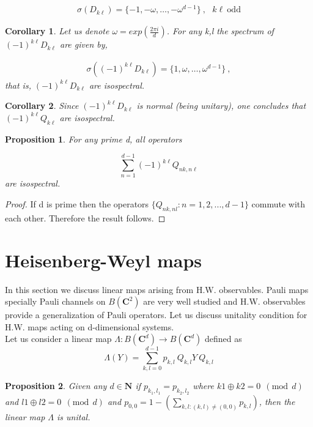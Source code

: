 \documentclass[12pt]{amsart}
\numberwithin{equation}{section}
\newtheorem{proposition}{Proposition}[section]
\newtheorem{corollary}{Corollary}[section]
\begin{document}
\begin{eqnarray*}
    \sigma(D_{k\ell}) = \{-1,-\omega,\ldots,-\omega^{d-1} \} \ , \ \ \ k\ell\ \mbox{odd}
\end{eqnarray*}
\fi

\vspace{1cm}

\begin{corollary} Let us denote $\omega=exp \left( \frac{2\pi i}{d}\right)$. For any k,l the spectrum of $(-1)^{k\ell} D_{k\ell}$  are given by,

\begin{eqnarray*}
    \sigma((-1)^{k\ell} D_{k\ell}) = \{1,\omega,\ldots,\omega^{d-1} \} \ , 
\end{eqnarray*}
that is, $(-1)^{k\ell} D_{k\ell}$ are isospectral.    
\end{corollary}

\begin{corollary} Since $(-1)^{k\ell} D_{k\ell}$ is normal (being unitary), one concludes that $(-1)^{k\ell} Q_{k\ell}$
are isospectral.
\end{corollary}
 \begin{proposition} For any prime d, all operators

$$    \sum_{n=1}^{d-1} (-1)^{k \ell} Q_{nk,n\ell}$$
are isospectral.
\end{proposition}
\begin{proof}
    If d is prime then the operators $\lbrace Q_{nk,nl}: n=1,2,...,d-1 \rbrace$ commute with each other. Therefore the result follows.
\end{proof}

\section{ Heisenberg-Weyl maps  } \label{IV}
In this section we discuss linear maps arising from H.W. observables. Pauli maps specially Pauli channels on $B\left(\mathbf{C}^2\right)$ are very well studied and H.W. observables provide a generalization of Pauli operators. Let us discuss unitality condition for H.W. maps acting on d-dimensional systems.  \\

Let us consider a linear map $\Lambda : B\left(\mathbf{C}^d\right) \rightarrow B\left(\mathbf{C}^d\right)$ defined as 
\begin{equation}\label{H.W. map}
    \Lambda (Y) = \sum_{k,l=0}^{d-1} p_{k,l}~ Q_{k,l} Y~ Q_{k,l}
\end{equation}
\begin{proposition}\label{unital}
    Given any $d \in \mathbf{N}$ if $p_{k_1,l_1}=p_{k_2,l_2}$ where $k1\oplus k2= 0~~ \left(\text{mod}~~ d\right)$ and  $l1\oplus l2=0 ~~\left(\text{mod}~~ d\right)$ and $p_{0,0}=1-\left( \sum_{k,l: (k,l)\neq (0,0)} p_{k,l} \right)$, then the linear map $\Lambda$ is unital. \\
\end{proposition}
\end{document}
